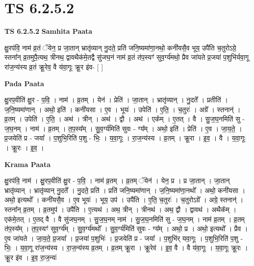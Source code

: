 \documentclass[17pt]{extarticle}
\begin{document}
\section{ TS 6.2.5.2 }

\textbf{TS 6.2.5.2 } \newline
\textbf{Samhita Paata} \newline

क्षु॒रप॑वि॒ नाम॑ व्र॒तं ॅयेन॒ प्र जा॒तान् भ्रातृ॑व्यान् नु॒दते॒ प्रति॑ जनि॒ष्यमा॑णा॒नथो॒ कनी॑यसै॒व भूय॒ उपै॑ति च॒तुरोऽग्रे॒ स्तना᳚न् व्र॒तमुपै॒त्यथ॒ त्रीनथ॒ द्वावथैक॑मे॒तद्वै सु॑जघ॒नं नाम॑ व्र॒तं त॑प॒स्यꣳ॑ सुव॒र्ग्य॑मथो॒ प्रैव जा॑यते प्र॒जया॑ प॒शुभि॑र्यवा॒गू रा॑ज॒न्य॑स्य व्र॒तं क्रू॒रेव॒ वै य॑वा॒गूः क्रू॒र इ॑व- [  ] \newline

\textbf{Pada Paata} \newline

क्षु॒रप॒वीति॑ क्षु॒र - प॒वि॒ । नाम॑ । व्र॒तम् । येन॑ । प्रेति॑ । जा॒तान् । भ्रातृ॑व्यान् । नु॒दते᳚ । प्रतीति॑ । ज॒नि॒ष्यमा॑णान् । अथो॒ इति॑ । कनी॑यसा । ए॒व । भूयः॑ । उपेति॑ । ए॒ति॒ । च॒तुरः॑ । अग्रे᳚ । स्तनान्॑ । व्र॒तम् । उपेति॑ । ए॒ति॒ । अथ॑ । त्रीन् । अथ॑ । द्वौ । अथ॑ । एक᳚म् । ए॒तत् । वै । सु॒ज॒घ॒नमिति॑ सु - ज॒घ॒नम् । नाम॑ । व्र॒तम् । त॒प॒स्य᳚म् । सु॒व॒र्ग्य॑मिति॑ सुवः - ग्य᳚म् । अथो॒ इति॑ । प्रेति॑ । ए॒व । जा॒य॒ते॒ । प्र॒जयेति॑ प्र - जया᳚ । प॒शुभि॒रिति॑ प॒शु - भिः॒ । य॒वा॒गूः । रा॒ज॒न्य॑स्य । व्र॒तम् । क्रू॒रा । इ॒व॒ । वै । य॒वा॒गूः । क्रू॒रः । इ॒व॒ ।  \newline


\textbf{Krama Paata} \newline

क्षु॒रप॑वि॒ नाम॑ । क्षु॒रप॒वीति॑ क्षु॒र - प॒वि॒ । नाम॑ व्र॒तम् । व्र॒तम् ॅयेन॑ । येन॒ प्र । प्र जा॒तान् । 
जा॒तान् भ्रातृ॑व्यान् । भ्रातृ॑व्यान् नु॒दते᳚ । नु॒दते॒ प्रति॑ । प्रति॑ जनि॒ष्यमा॑णान् । ज॒नि॒ष्यमा॑णा॒नथो᳚ । अथो॒ कनी॑यसा । अथो॒ इत्यथो᳚ । कनी॑यसै॒व । ए॒व भूयः॑ । भूय॒ उप॑ । उपै॑ति । ए॒ति॒ च॒तुरः॑ । च॒तुरोऽग्रे᳚ । अग्रे॒ स्तनान्॑ । स्तना᳚न् व्र॒तम् । व्र॒तमुप॑ । उपै॑ति । ए॒त्यथ॑ । अथ॒ त्रीन् । त्रीनथ॑ । अथ॒ द्वौ । द्वावथ॑ । अथैक᳚म् । एक॑मे॒तत् । ए॒तद् वै । वै सु॑जघ॒नम् । सु॒ज॒घ॒नम् नाम॑ । सु॒ज॒घ॒नमिति॑ सु - ज॒घ॒नम् । नाम॑ व्र॒तम् । व्र॒तम् त॑प॒स्य᳚म् । त॒प॒स्यꣳ॑ सुव॒र्ग्य᳚म् । सु॒व॒र्ग्य॑मथो᳚ । सु॒व॒र्ग्य॑मिति॑ सुवः - ग्य᳚म् । अथो॒ प्र । अथो॒ इत्यथो᳚ । प्रैव । ए॒व जा॑यते । जा॒य॒ते॒ प्र॒जया᳚ । प्र॒जया॑ प॒शुभिः॑ । प्र॒जयेति॑ प्र - जया᳚ । प॒शुभि॑र् यवा॒गूः । प॒शुभि॒रिति॑ प॒शु - भिः॒ । य॒वा॒गू रा॑ज॒न्य॑स्य । रा॒ज॒न्य॑स्य व्र॒तम् । व्र॒तम् क्रू॒रा । क्रू॒रेव॑ । इ॒व॒ वै । वै य॑वा॒गूः । य॒वा॒गूः क्रू॒रः । क्रू॒र इ॑व । इ॒व॒ रा॒ज॒न्यः॑ \newline
\end{document}
